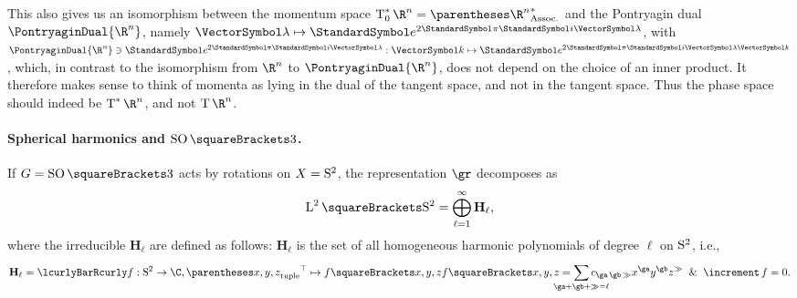 \documentclass[10pt, a4paper, twoside]{lecturenotes}
\newcommand{\Rn}{{\R^n}}
\begin{document}
\begin{supplemental}
This also gives us an isomorphism between the momentum space $\CotangentSpace 0 \Rn = \Dual{\pa\Rn}$ and the Pontryagin dual $\PontryaginDual \Rn$, namely $\FunctionBody \vgl {\E^{2 \Pi \I \vgl }}$, with $\PontryaginDual \Rn\owns\FunctionNamedBody{\E^{2 \Pi \I \vgl}} \vk {\E^{2 \Pi \I \vgl\vk}}$, which, in contrast to the isomorphism from $\Rn$ to $\PontryaginDual\Rn$, does not depend on the choice of an inner product. It therefore makes sense to think of momenta as lying in the dual of the tangent space, and not in the tangent space. Thus the phase space should indeed be $\CotangentBundle \Rn$, and not $\TangentBundle \Rn$.

\paragraph{Spherical harmonics and $\SpecialOrthogonalGroup\of 3$.} 
\newcommand{\degL}{\ell}
\newcommand{\Harmonic}[1]{\mathbf{H}_{#1}}
If $G=\SpecialOrthogonalGroup\of 3$ acts by rotations on $X=\mathrm{S}^{2}$, the representation $\gr$ decomposes as 
\begin{equation*}
\Lspace[2]\of{\UnitSphere 2} = \DirectSum{\degL=1}[\infty] \Harmonic\degL\text{,}
\end{equation*}
where the irreducible $\Harmonic\degL$ are defined as follows: $\Harmonic\degL$ is the set of all homogeneous harmonic polynomials of degree $\degL$ on $\mathrm{S}^{2}$, i.e.,
\begin{equation*}
\Harmonic\degL = \setst{\FunctionSpec f {\UnitSphere 2} \C, \FunctionBody {\Transpose{\tuple{x,y,z}}} {f\of{x,y,z}}}{f\of{x,y,z} = \sum {\ga+\gb+\gg = \degL} c_{\ga\,\gb\,\gg} x^{\ga}y^{\gb}z^{\gg} \And \Laplacian f = 0  }\text{.}
\end{equation*}
\endgroup
\end{supplemental}
\end{document}
